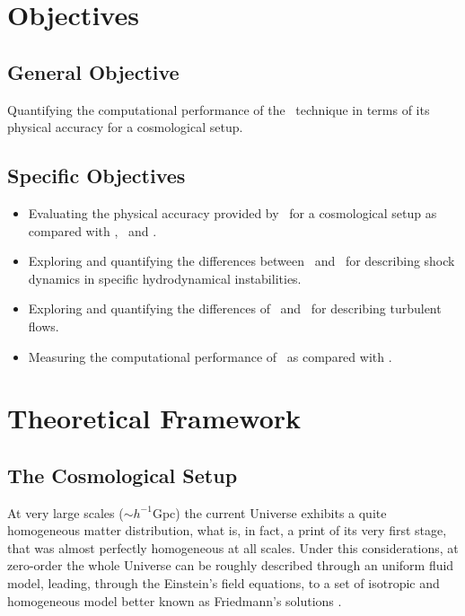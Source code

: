 \documentclass[a4,useAMS,usenatbib,usegraphicx,12pt]{article}
\begin{document}
\section{Objectives}
\subsection*{General Objective}
Quantifying the computational performance of the \VPH\ technique in terms of 
its physical accuracy for a cosmological setup.


\subsection*{Specific Objectives}
\begin{itemize}
\item Evaluating the physical accuracy provided by \VPH\ for a cosmological 
setup as compared with \AMR, \SPH\ and \AREPO.
\item Exploring and quantifying the differences between \VPH\ and \AMR\ for 
describing shock dynamics in specific hydrodynamical instabilities.
\item Exploring and quantifying the differences of \VPH\ and \SPH\ for 
describing turbulent flows.
\item Measuring the computational performance of \VPH\ as compared with \AREPO.
\end{itemize}


\section{Theoretical Framework}
\subsection*{The Cosmological Setup}
At very large scales ($\sim h^{-1}$Gpc) the current Universe exhibits a quite
homogeneous matter distribution, what is, in fact, a print of its very first 
stage, that was almost perfectly homogeneous at all scales. Under this 
considerations, at zero-order the whole Universe can be roughly described 
through an uniform fluid model, leading, through the Einstein's field equations,
to a set of isotropic and homogeneous model better known as Friedmann's 
solutions \citep{longair2008}.
\end{document}
